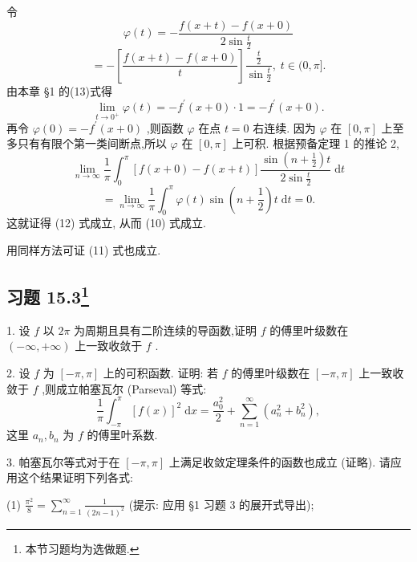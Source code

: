 令
\[
\varphi \left( t\right)  =  - \frac{f\left( {x + t}\right)  - f\left( {x + 0}\right) }{2\sin \frac{t}{2}}
\]
\[
=  - \left\lbrack  \frac{f\left( {x + t}\right)  - f\left( {x + 0}\right) }{t}\right\rbrack  \frac{\frac{t}{2}}{\sin \frac{t}{2}},\;t \in  (0,\pi \rbrack .
\]
由本章 §1 的(13)式得
\[
\mathop{\lim }\limits_{{t \rightarrow  {0}^{ + }}}\varphi \left( t\right)  =  - {f}^{\prime }\left( {x + 0}\right)  \cdot  1 =  - {f}^{\prime }\left( {x + 0}\right) .
\]
再令 \(\varphi \left( 0\right)  =  - {f}^{\prime }\left( {x + 0}\right)\) ,则函数 \(\varphi\) 在点 \(t = 0\) 右连续. 因为 \(\varphi\) 在 \(\left\lbrack  {0,\pi }\right\rbrack\) 上至多只有有限个第一类间断点,所以 \(\varphi\) 在 \(\left\lbrack  {0,\pi }\right\rbrack\) 上可积. 根据预备定理 1 的推论 2,
\[
\mathop{\lim }\limits_{{n \rightarrow  \infty }}\frac{1}{\pi }{\int }_{0}^{\pi }\left\lbrack  {f\left( {x + 0}\right)  - f\left( {x + t}\right) }\right\rbrack  \frac{\sin \left( {n + \frac{1}{2}}\right) t}{2\sin \frac{t}{2}}\mathrm{\;d}t
\]
\[
= \mathop{\lim }\limits_{{n \rightarrow  \infty }}\frac{1}{\pi }{\int }_{0}^{\pi }\varphi \left( t\right) \sin \left( {n + \frac{1}{2}}\right) t\mathrm{\;d}t = 0.
\]
这就证得 (12) 式成立, 从而 (10) 式成立.

用同样方法可证 (11) 式也成立.

\subsection{习题 15.3\footnote{本节习题均为选做题.}}

1. 设 \(f\) 以 \({2\pi }\) 为周期且具有二阶连续的导函数,证明 \(f\) 的傅里叶级数在 \(\left( {-\infty , + \infty }\right)\) 上一致收敛于 \(f\) .

2. 设 \(f\) 为 \(\left\lbrack  {-\pi ,\pi }\right\rbrack\) 上的可积函数. 证明: 若 \(f\) 的傅里叶级数在 \(\left\lbrack  {-\pi ,\pi }\right\rbrack\) 上一致收敛于 \(f\) ,则成立帕塞瓦尔 (Parseval) 等式:
\[
\frac{1}{\pi }{\int }_{-\pi }^{\pi }{\left\lbrack  f\left( x\right) \right\rbrack  }^{2}\mathrm{\;d}x = \frac{{a}_{0}^{2}}{2} + \mathop{\sum }\limits_{{n = 1}}^{\infty }\left( {{a}_{n}^{2} + {b}_{n}^{2}}\right) ,
\]
这里 \({a}_{n},{b}_{n}\) 为 \(f\) 的傅里叶系数.

3. 帕塞瓦尔等式对于在 \(\left\lbrack  {-\pi ,\pi }\right\rbrack\) 上满足收敛定理条件的函数也成立 (证略). 请应用这个结果证明下列各式:

(1) \(\frac{{\pi }^{2}}{8} = \mathop{\sum }\limits_{{n = 1}}^{\infty }\frac{1}{{\left( 2n - 1\right) }^{2}}\) (提示: 应用 §1 习题 3 的展开式导出);

